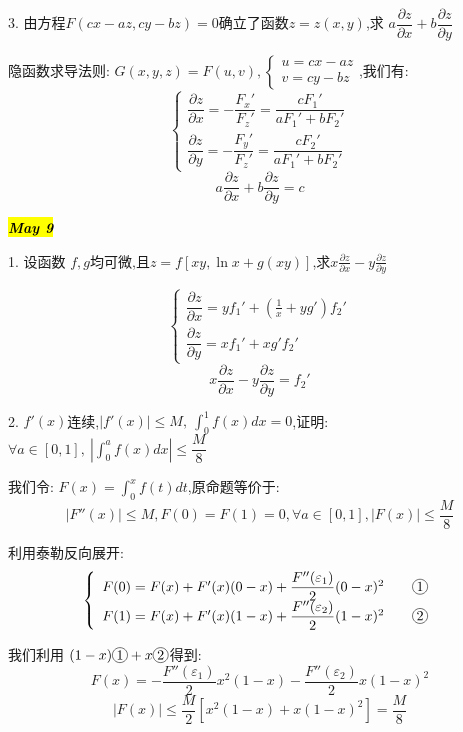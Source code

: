 
3. 由方程$F(cx-az,cy-bz)=0$确立了函数$z=z(x,y)$,求 $a\dfrac{\partial z}{\partial x}+b\dfrac{\partial z}{\partial y}$
\begin{solution}
	
	隐函数求导法则: 
	$G(x,y,z)=F(u,v),\left\lbrace\begin{array}{l}
		u=cx-az\\v=cy-bz
	\end{array} \right. $,我们有: 
	$$\left\lbrace\begin{array}{l}
		\dfrac{\partial z}{\partial x}=-\dfrac{F_{x}'}{F_{z}'}=\dfrac{cF_{1}'}{aF_{1}'+bF_{2}'}\\
		\dfrac{\partial z}{\partial y}=-\dfrac{F_{y}'}{F_{z}'}=\dfrac{cF_{2}'}{aF_{1}'+bF_{2}'}
	\end{array} \right. $$
	$$a\dfrac{\partial z}{\partial x}+b\dfrac{\partial z}{\partial y}=c$$
\end{solution}


\hl{\textbf{\textit{May 9}}}

1. 设函数 $f,g$均可微,且$z=f[xy,\ln x+g(xy)]$,求$x\frac{\partial z}{\partial x}-y\frac{\partial z}{\partial y}$
\begin{solution}
	$$\left\lbrace 
	\begin{array}{l}
		\dfrac{\partial z}{\partial x}=yf_{1}'+(\frac{1}{x}+yg')f_{2}'\\
		\dfrac{\partial z}{\partial y}=xf_{1}'+xg'f_{2}'
	\end{array}\right. $$
	$$x\frac{\partial z}{\partial x}-y\frac{\partial z}{\partial y}=f_{2}'$$
\end{solution}


2. $f'(x)$连续,\quad$|f'(x)|\leq M,\ \int_{0}^{1}f(x)dx=0$,证明: $\forall a\in [0,1],\ |\int_{0}^{a}f(x)dx|\leq \dfrac{M}{8}$
\begin{solution}
	
	我们令: $F(x)=\int_{0}^{x}f(t)dt$,原命题等价于: 
	$$|F''(x)|\leq M, F(0)=F(1)=0, \forall a\in [0,1],|F(x)|\leq \frac{M}{8}$$
	
	利用泰勒反向展开: 
	$$\left\lbrace 
	\begin{array}{l}
		F(0)=F(x)+F'(x)(0-x)+\dfrac{F''(\varepsilon_{1})}{2}(0-x)^2 \qquad \circled{1} \\
		F(1)=F(x)+F'(x)(1-x)+\dfrac{F''(\varepsilon_{2})}{2}(1-x)^2 \qquad \circled{2}
	\end{array}\right. $$
	
	我们利用 $(1-x) \circled{1}+x \circled{2}$得到: 
	$$F(x)=-\frac{F''(\varepsilon_{1})}{2}x^2(1-x)-\frac{F''(\varepsilon_{2})}{2}x(1-x)^2$$
	$$|F(x)|\leq \frac{M}{2}[x^2(1-x)+x(1-x)^2]=\frac{M}{8}$$
\end{solution}

